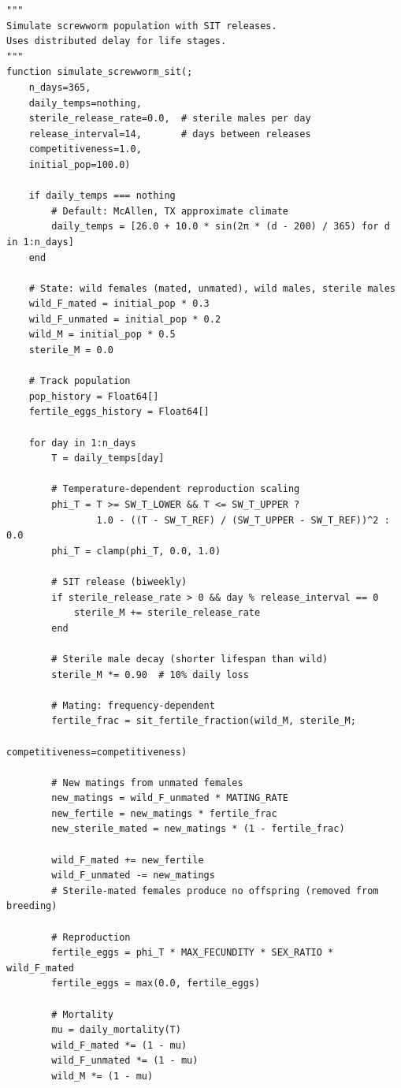 \begin{verbatim}
"""
Simulate screwworm population with SIT releases.
Uses distributed delay for life stages.
"""
function simulate_screwworm_sit(;
    n_days=365,
    daily_temps=nothing,
    sterile_release_rate=0.0,  # sterile males per day
    release_interval=14,       # days between releases
    competitiveness=1.0,
    initial_pop=100.0)

    if daily_temps === nothing
        # Default: McAllen, TX approximate climate
        daily_temps = [26.0 + 10.0 * sin(2π * (d - 200) / 365) for d in 1:n_days]
    end

    # State: wild females (mated, unmated), wild males, sterile males
    wild_F_mated = initial_pop * 0.3
    wild_F_unmated = initial_pop * 0.2
    wild_M = initial_pop * 0.5
    sterile_M = 0.0

    # Track population
    pop_history = Float64[]
    fertile_eggs_history = Float64[]

    for day in 1:n_days
        T = daily_temps[day]

        # Temperature-dependent reproduction scaling
        phi_T = T >= SW_T_LOWER && T <= SW_T_UPPER ?
                1.0 - ((T - SW_T_REF) / (SW_T_UPPER - SW_T_REF))^2 : 0.0
        phi_T = clamp(phi_T, 0.0, 1.0)

        # SIT release (biweekly)
        if sterile_release_rate > 0 && day % release_interval == 0
            sterile_M += sterile_release_rate
        end

        # Sterile male decay (shorter lifespan than wild)
        sterile_M *= 0.90  # 10% daily loss

        # Mating: frequency-dependent
        fertile_frac = sit_fertile_fraction(wild_M, sterile_M;
                                            competitiveness=competitiveness)

        # New matings from unmated females
        new_matings = wild_F_unmated * MATING_RATE
        new_fertile = new_matings * fertile_frac
        new_sterile_mated = new_matings * (1 - fertile_frac)

        wild_F_mated += new_fertile
        wild_F_unmated -= new_matings
        # Sterile-mated females produce no offspring (removed from breeding)

        # Reproduction
        fertile_eggs = phi_T * MAX_FECUNDITY * SEX_RATIO * wild_F_mated
        fertile_eggs = max(0.0, fertile_eggs)

        # Mortality
        mu = daily_mortality(T)
        wild_F_mated *= (1 - mu)
        wild_F_unmated *= (1 - mu)
        wild_M *= (1 - mu)


\end{verbatim}
